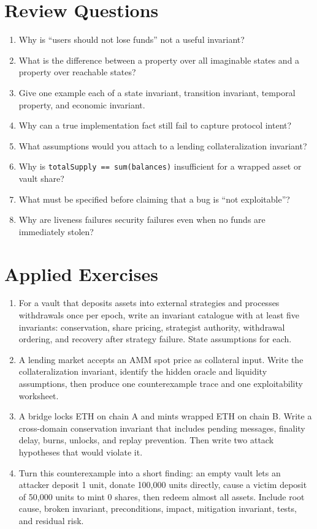 \section*{Review Questions}

\begin{enumerate}
\item Why is ``users should not lose funds'' not a useful invariant?
\item What is the difference between a property over all imaginable states and a property over reachable states?
\item Give one example each of a state invariant, transition invariant, temporal property, and economic invariant.
\item Why can a true implementation fact still fail to capture protocol intent?
\item What assumptions would you attach to a lending collateralization invariant?
\item Why is \texttt{totalSupply == sum(balances)} insufficient for a wrapped asset or vault share?
\item What must be specified before claiming that a bug is ``not exploitable''?
\item Why are liveness failures security failures even when no funds are immediately stolen?
\end{enumerate}

\section*{Applied Exercises}

\begin{enumerate}
\item For a vault that deposits assets into external strategies and processes withdrawals once per epoch, write an invariant catalogue with at least five invariants: conservation, share pricing, strategist authority, withdrawal ordering, and recovery after strategy failure. State assumptions for each.

\item A lending market accepts an AMM spot price as collateral input. Write the collateralization invariant, identify the hidden oracle and liquidity assumptions, then produce one counterexample trace and one exploitability worksheet.

\item A bridge locks ETH on chain A and mints wrapped ETH on chain B. Write a cross-domain conservation invariant that includes pending messages, finality delay, burns, unlocks, and replay prevention. Then write two attack hypotheses that would violate it.

\item Turn this counterexample into a short finding: an empty vault lets an attacker deposit 1 unit, donate 100,000 units directly, cause a victim deposit of 50,000 units to mint 0 shares, then redeem almost all assets. Include root cause, broken invariant, preconditions, impact, mitigation invariant, tests, and residual risk.
\end{enumerate}
